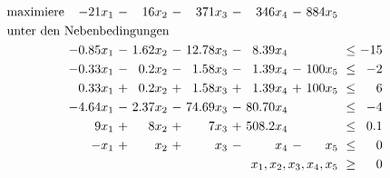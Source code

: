 \documentclass [a4paper,11pt]{article}
\begin{document}
\begin{enumerate}
\begin{enumerate}
                    \begin{align*}
                    \begin{alignedat}{7}
                    & \text{maximiere } & -21x_1 &\ - &\ 16x_2 &\ - &\ 371x_3 &\ - &\ 346x_4 &\ - &\ 884x_5 & & \\
                    & \rlap{unter den Nebenbedingungen} & & & & & & & & & & & \\
                    &&-0.85x_1 &\ - &\ 1.62x_2 &\ - &\ 12.78x_3 &\ - &\  8.39x_4 &    &         &\ \leq &\ -15 \\
                    &&-0.33x_1 &\ - &\  0.2x_2 &\ - &\  1.58x_3 &\ - &\  1.39x_4 &\ - &\ 100x_5 &\ \leq &\  -2 \\
                    && 0.33x_1 &\ + &\  0.2x_2 &\ + &\  1.58x_3 &\ + &\  1.39x_4 &\ + &\ 100x_5 &\ \leq &\   6 \\
                    &&-4.64x_1 &\ - &\ 2.37x_2 &\ - &\ 74.69x_3 &\ - &\ 80.70x_4 &    &         &\ \leq &\  -4 \\
                    &&    9x_1 &\ + &\    8x_2 &\ + &\     7x_3 &\ + &\ 508.2x_4 &    &         &\ \leq &\ 0.1 \\
                    &&    -x_1 &\ + &\     x_2 &\ + &\      x_3 &\ - &\      x_4 &\ - &\    x_5 &\ \leq &\   0 \\
                    && & & & & & & & & \llap{$x_1, x_2, x_3, x_4, x_5$} &\ \geq &\ 0
                    \end{alignedat}
                    \end{align*}
		\end{enumerate}
            
            

    \end{enumerate}
\end{document}

